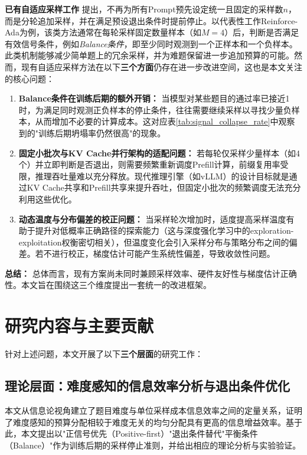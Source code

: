 \textbf{已有自适应采样工作} 提出，不再为所有Prompt预先设定统一且固定的采样数$n$，而是分轮追加采样，并在满足预设退出条件时提前停止。以代表性工作Reinforce-Ada为例，该类方法通常在每轮采样固定数量样本（如$M=4$）后，判断是否满足有效信号条件，例如\textit{Balance条件}，即至少同时观测到一个正样本和一个负样本。此类机制能够减少简单题上的冗余采样，并为难题保留进一步追加预算的可能。然而，现有自适应采样方法在以下\textbf{三个方面}仍存在进一步改进空间，这也是本文关注的核心问题：

\begin{enumerate}
    \item \textbf{Balance条件在训练后期的额外开销：} 当模型对某些题目的通过率已接近1时，为满足同时观测正负样本的停止条件，往往需要继续采样以寻找少量负样本，从而增加不必要的计算成本。这对应表\ref{tab:signal_collapse_rate}中观察到的"训练后期坍塌率仍然很高"的现象。
    
    \item \textbf{固定小批次与KV Cache并行架构的适配问题：} 若每轮仅采样少量样本（如4个）并立即判断是否退出，则需要频繁重新调度Prefill计算，前缀复用率受限，推理吞吐量难以充分释放。现代推理引擎（如vLLM）的设计目标就是通过KV Cache共享和Prefill共享来提升吞吐，但固定小批次的频繁调度无法充分利用这些优化。
    
    \item \textbf{动态温度与分布偏差的校正问题：} 当采样轮次增加时，适度提高采样温度有助于提升对低概率正确路径的探索能力（这与深度强化学习中的exploration-exploitation权衡密切相关），但温度变化会引入采样分布与策略分布之间的偏差。若不进行校正，梯度估计可能产生系统性偏差，导致收敛性问题。
\end{enumerate}

\textbf{总结：} 总体而言，现有方案尚未同时兼顾采样效率、硬件友好性与梯度估计正确性。本文旨在围绕这三个维度提出一套统一的改进框架。

\section{研究内容与主要贡献}
\label{sec:contributions}

针对上述问题，本文开展了以下\textbf{三个层面}的研究工作：

\subsection{理论层面：难度感知的信息效率分析与退出条件优化}
\label{subsec:theory_contribution}

本文从信息论视角建立了题目难度与单位采样成本信息效率之间的定量关系，证明了难度感知的预算分配相较于难度无关的均匀分配具有更高的信息增益效率。基于此，本文提出以"正信号优先（Positive-first）"退出条件替代"平衡条件（Balance）"作为训练后期的采样停止准则，并给出相应的理论分析与实验验证。


